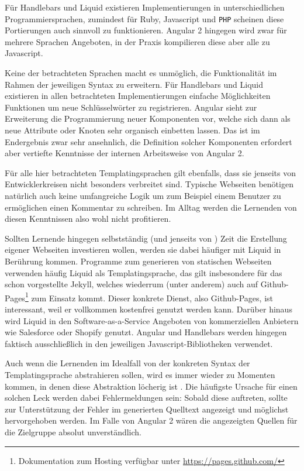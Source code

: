 Für Handlebars und Liquid existieren Implementierungen in unterschiedlichen Programmiersprachen, zumindest für Ruby, Javascript und \texttt{PHP} scheinen diese Portierungen auch sinnvoll zu funktionieren. Angular 2 hingegen wird zwar für mehrere Sprachen Angeboten, in der Praxis kompilieren diese aber alle zu Javascript.

Keine der betrachteten Sprachen macht es unmöglich, die Funktionalität im Rahmen der jeweiligen Syntax zu erweitern. Für Handlebars und Liquid existieren in allen betrachteten Implementierungen einfache Möglichkeiten Funktionen um neue Schlüsselwörter zu registrieren. Angular sieht zur Erweiterung die Programmierung neuer Komponenten vor, welche sich dann als neue Attribute oder Knoten sehr organisch einbetten lassen. Das ist im Endergebnis zwar sehr ansehnlich, die Definition solcher Komponenten erfordert aber vertiefte Kenntnisse der internen Arbeitsweise von Angular 2.

Für alle hier betrachteten Templatingsprachen gilt ebenfalls, dass sie jenseits von Entwicklerkreisen nicht besonders verbreitet sind. Typische Webseiten benötigen natürlich auch keine umfangreiche Logik um zum Beispiel einem Benutzer zu ermöglichen einen Kommentar zu schreiben. Im Alltag werden die Lernenden von diesen Kenntnissen also wohl nicht profitieren.

Sollten Lernende hingegen selbstständig (und jenseits von \idename{}) Zeit die Erstellung eigener Webseiten investieren wollen, werden sie dabei häufiger mit Liquid in Berührung kommen. Programme zum generieren von statischen Webseiten verwenden häufig Liquid als Templatingsprache, das gilt insbesondere für das schon vorgestellte Jekyll, welches wiederrum (unter anderem) auch auf Github-Pages\footnote{Dokumentation zum Hosting verfügbar unter \url{https://pages.github.com/}} zum Einsatz kommt. Dieser konkrete Dienst, also Github-Pages, ist interessant, weil er vollkommen kostenfrei genutzt werden kann. Darüber hinaus wird Liquid in den Software-as-a-Service Angeboten von kommerziellen Anbietern wie Salesforce oder Shopify genutzt. Angular und Handlebars werden hingegen faktisch ausschließlich in den jeweiligen Javascript-Bibliotheken verwendet.

Auch wenn die Lernenden im Idealfall von der konkreten Syntax der Templatingsprache abstrahieren sollen, wird es immer wieder zu Momenten kommen, in denen diese Abstraktion löcherig ist \cite{spolsky_law_abstractions}. Die häufigste Ursache für einen solchen Leck werden dabei Fehlermeldungen sein: Sobald diese auftreten, sollte zur Unterstützung der Fehler im generierten Quelltext angezeigt und möglichst hervorgehoben werden. Im Falle von Angular 2 wären die angezeigten Quellen für die Zielgruppe absolut unverständlich.

